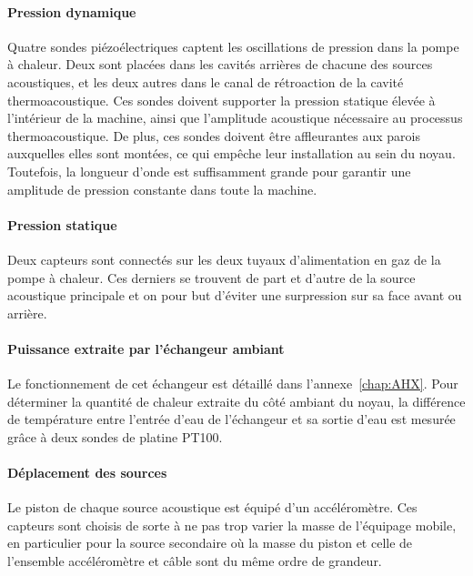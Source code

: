 \paragraph*{Pression dynamique} Quatre sondes  piézoélectriques captent les oscillations de pression dans la pompe à chaleur. Deux sont placées dans les cavités arrières de  chacune des sources acoustiques, et les deux autres dans le canal de rétroaction de la cavité thermoacoustique. Ces sondes doivent supporter la pression statique élevée à l'intérieur de la machine, ainsi que l'amplitude acoustique nécessaire au processus thermoacoustique. De plus, ces sondes doivent être affleurantes aux parois auxquelles elles sont montées, ce qui empêche leur installation au sein du noyau. Toutefois, la longueur d'onde  est suffisamment grande pour garantir une amplitude de pression constante dans toute la machine.

\paragraph*{Pression statique} Deux capteurs  sont connectés sur les deux tuyaux d'alimentation en gaz de la pompe  à chaleur. Ces derniers se trouvent de part et d'autre de la source acoustique principale et on pour but d'éviter une surpression sur sa face avant ou arrière.

\paragraph*{Puissance extraite par l'échangeur ambiant} Le fonctionnement de cet échangeur est détaillé dans l'annexe~\ref{chap:AHX}. Pour déterminer la quantité de chaleur extraite du côté ambiant du noyau, la différence de température entre l'entrée d'eau de l'échangeur et sa sortie d'eau est mesurée grâce à deux sondes de platine PT100.

\paragraph*{Déplacement des sources} Le piston de chaque source acoustique est équipé d'un accéléromètre. Ces capteurs sont choisis de sorte à ne pas trop varier la masse de l'équipage mobile, en particulier pour la source secondaire où la masse du piston et celle de l'ensemble accéléromètre et câble sont du même ordre de grandeur.



